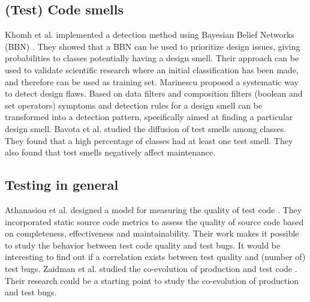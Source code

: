 \documentclass{uvamscse}
\newcommand{\AtestCodeQuality}{Athanasiou et al.}
\newcommand{\ACoEvolution}{Zaidman et al.}
\newcommand{\AbayesianDetectCodeDesignSmells}{Khomh et al.}
\newcommand{\AsmellsEmpiric}{Bavota et al.}
\newcommand{\AdetectionStrategies}{Marinescu}
\begin{document}
\subsection{(Test) Code smells}
\AbayesianDetectCodeDesignSmells{} implemented a detection method using Bayesian Belief Networks (BBN) \cite{khomh2009bayesian}. They showed that a BBN can be used to prioritize design issues, giving probabilities to classes potentially having a design smell. Their approach can be used to validate scientific research where an initial classification has been made, and therefore can be used as training set. \AdetectionStrategies{} proposed a systematic way to detect design flaws. Based on data filters and composition filters (boolean and set operators) symptoms and detection rules for a design smell can be transformed into a detection pattern, specifically aimed at finding a particular design smell. \AsmellsEmpiric{} studied the diffusion of test smells among classes. They found that a high percentage of classes had at least one test smell. They also found that test smells negatively affect maintenance. 

\subsection{Testing in general}
\AtestCodeQuality{} designed a model for measuring the quality of test code \cite{athanasiou2014test}. They incorporated static source code metrics to assess the quality of source code based on completeness, effectiveness and maintainability.  Their work makes it possible to study the behavior between test code quality and test bugs. It would be interesting to find out if a correlation exists between test quality and (number of) test bugs. \ACoEvolution{} studied the co-evolution of production and test code \cite{zaidman2008mining}. Their research could be a starting point to study the co-evolution of production and test bugs.    

\end{document}
